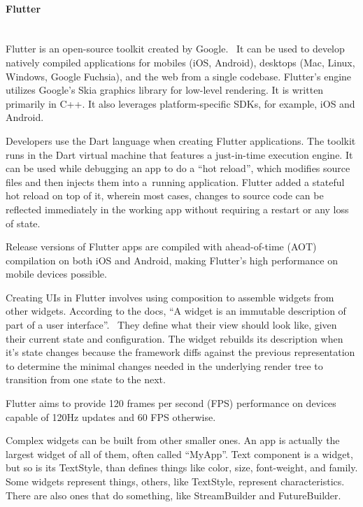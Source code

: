 \paragraph{\large{Flutter}}\mbox{}\\[2pt]
Flutter is an open-source toolkit created by Google.~\cite{flutter} It can be used to develop natively compiled applications for mobiles (iOS, Android), desktops (Mac, Linux, Windows, Google Fuchsia), and the web from a single codebase. Flutter's engine utilizes Google's Skia graphics library for low-level rendering. It is written primarily in C++. It also leverages platform-specific SDKs, for example, iOS and Android.

Developers use the Dart language when creating Flutter applications. The toolkit runs in the Dart virtual machine that features a just-in-time execution engine. It can be used while debugging an app to do a ``hot reload'', which modifies source files and then injects them into a~running application. Flutter added a stateful hot reload on top of it, wherein most cases, changes to source code can be reflected immediately in the working app without requiring a restart or any loss of state.

Release versions of Flutter apps are compiled with ahead-of-time (AOT) compilation on both iOS and Android, making Flutter's high performance on mobile devices possible.~\cite{flutter-wiki}

Creating UIs in Flutter involves using composition to assemble widgets from other widgets. According to the docs, ``A widget is an immutable description of part of a user interface''.~\cite{flutter} They define what their view should look like, given their current state and configuration. The widget rebuilds its description when it's state changes because the framework diffs against the previous representation to determine the minimal changes needed in the underlying render tree to transition from one state to the next.

Flutter aims to provide 120 frames per second (FPS) performance on devices capable of 120Hz updates and 60 FPS otherwise.

Complex widgets can be built from other smaller ones. An app is actually the largest widget of all of them, often called ``MyApp''. Text component is a widget, but so is its TextStyle, than defines things like color, size, font-weight, and family. Some widgets represent things, others, like TextStyle, represent characteristics. There are also ones that do something, like StreamBuilder and FutureBuilder.


